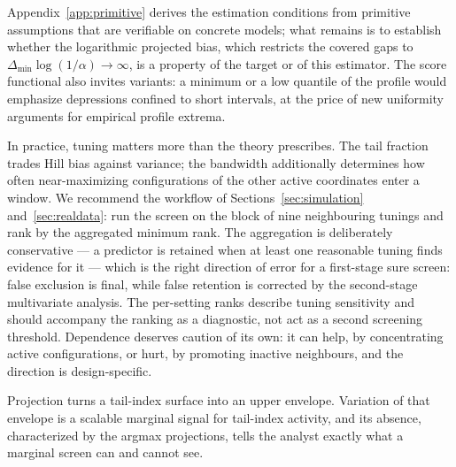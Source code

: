 \documentclass[bj,authoryear]{imsart}
\theoremstyle{plain}
\begin{document}
Appendix~\ref{app:primitive} derives the estimation conditions from
primitive assumptions that are verifiable on concrete models; what
remains is to establish whether the logarithmic projected bias, which
restricts the covered gaps to $\Delta_{\min}\log(1/\alpha)\to\infty$, is a
property of the target or of this estimator. The score functional also
invites variants: a minimum or a low quantile of the profile would
emphasize depressions confined to short intervals, at the price of new
uniformity arguments for empirical profile extrema.

In practice, tuning matters more than the theory prescribes. The tail
fraction trades Hill bias against variance; the bandwidth additionally
determines how often near-maximizing configurations of the other active
coordinates enter a window. We recommend the workflow of
Sections~\ref{sec:simulation} and~\ref{sec:realdata}: run the screen on
the block of nine neighbouring tunings and rank by the aggregated
minimum rank. The aggregation is deliberately conservative --- a
predictor is retained when at least one reasonable tuning finds
evidence for it --- which is the right direction of error for a
first-stage sure screen: false exclusion is final, while false
retention is corrected by the second-stage multivariate analysis. The
per-setting ranks describe tuning sensitivity and should accompany the
ranking as a diagnostic, not act as a second screening threshold.
Dependence deserves caution of its own: it can help, by concentrating
active configurations, or hurt, by promoting inactive neighbours, and
the direction is design-specific.

Projection turns a tail-index surface into an upper envelope. Variation
of that envelope is a scalable marginal signal for tail-index activity,
and its absence, characterized by the argmax projections, tells the
analyst exactly what a marginal screen can and cannot see.
\end{document}
